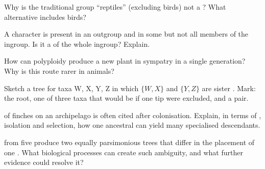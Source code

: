 \begin{exercise}[$\star\star$]\label{exo:g12:phylogeny-macroevolution:7}
Why is the traditional group ``reptiles'' (excluding birds) not a
? What  alternative includes birds?
\end{exercise}

\begin{exercise}[$\star\star$]\label{exo:g12:phylogeny-macroevolution:8}
A character is present in an outgroup and in some but not all members
of the ingroup. Is it a  of the whole ingroup?
Explain.
\end{exercise}

\begin{exercise}[$\star\star$]\label{exo:g12:phylogeny-macroevolution:9}
How can polyploidy produce a new plant  in sympatry in a single
generation? Why is this route rarer in animals?
\end{exercise}

\begin{exercise}[$\star\star\star$]\label{exo:g12:phylogeny-macroevolution:10}
Sketch a tree for taxa W, X, Y, Z in which $\{W,X\}$ and $\{Y,Z\}$ are
sister . Mark: the root, one  of three taxa that would be
 if one tip were excluded, and a  pair.
\end{exercise}

\begin{exercise}[$\star\star\star$]\label{exo:g12:phylogeny-macroevolution:11}
 of finches on an archipelago is often cited after
colonisation. Explain, in terms of , isolation and selection, how
one ancestral  can yield many specialised descendants.
\end{exercise}

\begin{exercise}[$\star\star\star$]\label{exo:g12:phylogeny-macroevolution:12}
  from five  produce two equally parsimonious trees
that differ in the placement of one . What biological processes
can create such ambiguity, and what further evidence could resolve it?
\end{exercise}

